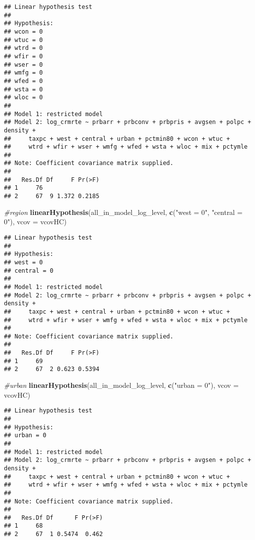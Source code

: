 \documentclass[
]{article}
\newenvironment{Shaded}{\begin{snugshade}}{\end{snugshade}}
\newcommand{\CommentTok}[1]{\textcolor[rgb]{0.56,0.35,0.01}{\textit{#1}}}
\newcommand{\DataTypeTok}[1]{\textcolor[rgb]{0.13,0.29,0.53}{#1}}
\newcommand{\KeywordTok}[1]{\textcolor[rgb]{0.13,0.29,0.53}{\textbf{#1}}}
\newcommand{\NormalTok}[1]{#1}
\newcommand{\StringTok}[1]{\textcolor[rgb]{0.31,0.60,0.02}{#1}}
\begin{document}
\begin{verbatim}
## Linear hypothesis test
## 
## Hypothesis:
## wcon = 0
## wtuc = 0
## wtrd = 0
## wfir = 0
## wser = 0
## wmfg = 0
## wfed = 0
## wsta = 0
## wloc = 0
## 
## Model 1: restricted model
## Model 2: log_crmrte ~ prbarr + prbconv + prbpris + avgsen + polpc + density + 
##     taxpc + west + central + urban + pctmin80 + wcon + wtuc + 
##     wtrd + wfir + wser + wmfg + wfed + wsta + wloc + mix + pctymle
## 
## Note: Coefficient covariance matrix supplied.
## 
##   Res.Df Df     F Pr(>F)
## 1     76                
## 2     67  9 1.372 0.2185
\end{verbatim}

\begin{Shaded}
\begin{Highlighting}[]
\CommentTok{#region}
\KeywordTok{linearHypothesis}\NormalTok{(all_in_model_log_level, }
                 \KeywordTok{c}\NormalTok{(}\StringTok{"west = 0"}\NormalTok{, }\StringTok{"central = 0"}\NormalTok{), }
                 \DataTypeTok{vcov =}\NormalTok{ vcovHC)}
\end{Highlighting}
\end{Shaded}

\begin{verbatim}
## Linear hypothesis test
## 
## Hypothesis:
## west = 0
## central = 0
## 
## Model 1: restricted model
## Model 2: log_crmrte ~ prbarr + prbconv + prbpris + avgsen + polpc + density + 
##     taxpc + west + central + urban + pctmin80 + wcon + wtuc + 
##     wtrd + wfir + wser + wmfg + wfed + wsta + wloc + mix + pctymle
## 
## Note: Coefficient covariance matrix supplied.
## 
##   Res.Df Df     F Pr(>F)
## 1     69                
## 2     67  2 0.623 0.5394
\end{verbatim}

\begin{Shaded}
\begin{Highlighting}[]
\CommentTok{#urban}
\KeywordTok{linearHypothesis}\NormalTok{(all_in_model_log_level, }
                 \KeywordTok{c}\NormalTok{(}\StringTok{"urban = 0"}\NormalTok{), }
                 \DataTypeTok{vcov =}\NormalTok{ vcovHC)}
\end{Highlighting}
\end{Shaded}

\begin{verbatim}
## Linear hypothesis test
## 
## Hypothesis:
## urban = 0
## 
## Model 1: restricted model
## Model 2: log_crmrte ~ prbarr + prbconv + prbpris + avgsen + polpc + density + 
##     taxpc + west + central + urban + pctmin80 + wcon + wtuc + 
##     wtrd + wfir + wser + wmfg + wfed + wsta + wloc + mix + pctymle
## 
## Note: Coefficient covariance matrix supplied.
## 
##   Res.Df Df      F Pr(>F)
## 1     68                 
## 2     67  1 0.5474  0.462
\end{verbatim}
\end{document}
